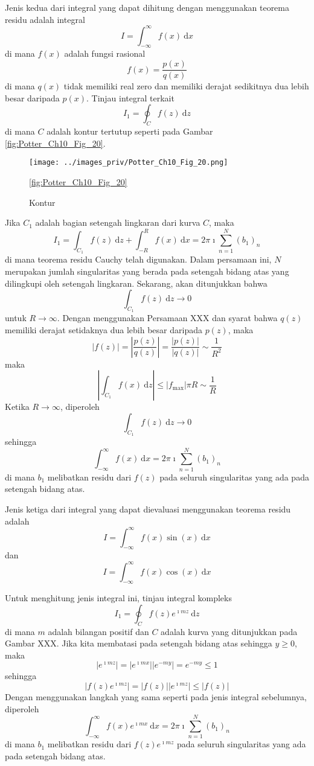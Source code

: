 Jenis kedua dari integral yang dapat dihitung dengan menggunakan teorema
residu adalah integral
\[
I=\int_{-\infty}^{\infty}f(x)\ \mathrm{d}x
\]
di mana $f(x)$ adalah fungsi rasional
\[
f(x)=\frac{p(x)}{q(x)}
\]
di mana $q(x)$ tidak memiliki real zero dan memiliki derajat sedikitnya
dua lebih besar daripada $p(x)$. Tinjau integral terkait
\begin{equation*}
I_{1} = \oint_{C}f(z)\ \mathrm{d}z
\end{equation*}
di mana $C$ adalah kontur tertutup seperti pada
Gambar \ref{fig:Potter_Ch10_Fig_20}.
\begin{figure}[h]
{\centering
\texttt{[image: ../images\_priv/Potter\_Ch10\_Fig\_20.png]}
\par}
\caption{Kontur}\ref{fig:Potter_Ch10_Fig_20}
\end{figure}
Jika $C_{1}$ adalah bagian setengah lingkaran dari kurva $C$, maka 
\[
I_{1} = \int_{C_{1}}f(z)\ \mathrm{d}z + \int_{-R}^{R}f(x)\ \mathrm{d}x = 2\pi\imath\sum_{n=1}^{N}\left(b_{1}\right)_{n}
\]
di mana teorema residu Cauchy telah digunakan. Dalam persamaan ini,
$N$ merupakan jumlah singularitas yang berada pada setengah bidang
atas yang dilingkupi oleh setengah lingkaran. Sekarang, akan ditunjukkan
bahwa
\[
\int_{C_{1}}f(z)\ \mathrm{d}z \rightarrow 0
\]
untuk $R\rightarrow\infty$. Dengan menggunakan Persamaan XXX dan
syarat bahwa $q(z)$ memiliki derajat setidaknya dua lebih besar daripada
$p(z)$, maka
\[
|f(z)|=\left|\frac{p(z)}{q(z)}\right|=\frac{|p(z)|}{|q(z)|}\sim\frac{1}{R^{2}}
\]
maka
\[
\left|\int_{C_{1}}f(x)\ \mathrm{d}z\right|\leq\left|f_{\mathrm{max}}\right|\pi R\sim\frac{1}{R}
\]
Ketika $R\rightarrow\infty$, diperoleh
\[
\int_{C_{1}}f(z)\ \mathrm{d}z\rightarrow0
\]
sehingga
\[
\int_{-\infty}^{\infty}f(x)\ \mathrm{d}x=2\pi\imath\sum_{n=1}^{N}\left(b_{1}\right)_{n}
\]
di mana $b_{1}$ melibatkan residu dari $f(z)$ pada seluruh singularitas
yang ada pada setengah bidang atas.

Jenis ketiga dari integral yang dapat dievaluasi menggunakan teorema
residu adalah
\[
I=\int_{-\infty}^{\infty}f(x)\sin(x)\ \mathrm{d}x
\]
dan
\[
I=\int_{-\infty}^{\infty}f(x)\cos(x)\ \mathrm{d}x
\]

Untuk menghitung jenis integral ini, tinjau integral kompleks
\[
I_{1} = \oint_{C} f(z) e^{\imath mz}\ \mathrm{d}z
\]
di mana $m$ adalah bilangan positif dan $C$ adalah kurva yang ditunjukkan
pada Gambar XXX. Jika kita membatasi pada setengah bidang atas sehingga
$y\geq0$, maka
\[
\left| e^{\imath mz} \right| = \left|e^{\imath mx}\right| \left| e^{-my} \right| = e^{-my} \leq 1
\]
sehingga
\[
\left|f(z)e^{\imath mz}\right|=\left|f(z)\right|\left|e^{\imath mz}\right|\leq\left|f(z)\right|
\]
Dengan menggunakan langkah yang sama seperti pada jenis integral sebelumnya,
diperoleh
\[
\int_{-\infty}^{\infty}f(x)e^{\imath mx}\ \mathrm{d}x=2\pi\imath\sum_{n=1}^{N}\left(b_{1}\right)_{n}
\]
di mana $b_{1}$ melibatkan residu dari $f(z)e^{\imath mz}$ pada
seluruh singularitas yang ada pada setengah bidang atas.


